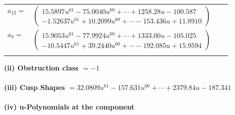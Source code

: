 \documentclass[1p]{elsarticle_modified}
\theoremstyle{definition}
\begin{document}
\begin{tabular}{m{7pt} m{180pt} m{7pt} m{180pt} }
\flushright $a_{12}=$&$\begin{pmatrix}15.5897 u^{61}-75.0040 u^{60}+\cdots+1258.28 u-100.587\\-1.52637 u^{61}+10.2099 u^{60}+\cdots-153.436 u+11.8910\end{pmatrix}$ \\
\flushright $a_{8}=$&$\begin{pmatrix}15.9053 u^{61}-77.9924 u^{60}+\cdots+1333.00 u-105.025\\-10.5447 u^{61}+39.2440 u^{60}+\cdots-192.085 u+15.9594\end{pmatrix}$\\&\end{tabular}
\flushleft \textbf{(ii) Obstruction class $= -1$}\\~\\
\flushleft \textbf{(iii) Cusp Shapes $= 32.0809 u^{61}-157.631 u^{60}+\cdots+2379.84 u-187.341$}\\~\\
\newpage\renewcommand{\arraystretch}{1}
\flushleft \textbf{(iv) u-Polynomials at the component}\newline \\
\end{document}
